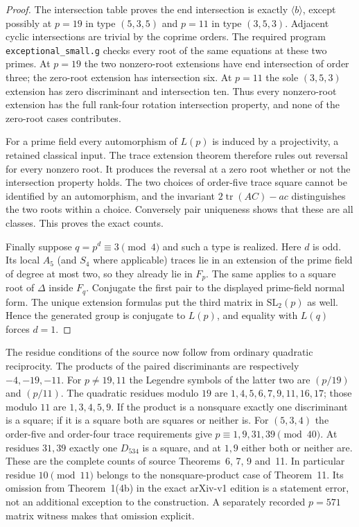 \begin{proof}
The intersection table proves the end intersection is exactly
$\langle b\rangle$, except possibly at $p=19$ in type $(5,3,5)$
and $p=11$ in type $(3,5,3)$. Adjacent cyclic intersections are trivial
by the coprime orders. The required program \texttt{exceptional\_small.g}
checks every root of the same equations at these two primes. At $p=19$
the two nonzero-root extensions have end intersection of order three;
the zero-root extension has intersection six. At $p=11$ the sole
$(3,5,3)$ extension has zero discriminant and intersection ten.
Thus every nonzero-root extension has the full rank-four rotation
intersection property, and none of the zero-root cases contributes.

For a prime field every automorphism of $L(p)$ is induced by a
projectivity, a retained classical input. The trace extension theorem
therefore rules out reversal for every nonzero root. It produces the
reversal at a zero root whether or not the intersection property holds.
The two choices of order-five trace square cannot be identified by
an automorphism, and the invariant $2\operatorname{tr}(AC)-ac$
distinguishes the two roots within a choice. Conversely pair uniqueness
shows that these are all classes. This proves the exact counts.

Finally suppose $q=p^d\equiv3\pmod4$ and such a type is realized.
Here $d$ is odd. Its local $A_5$ (and $S_4$ where applicable) traces
lie in an extension of the prime field of degree at most two, so they
already lie in $F_p$. The same applies to a square root of $\Delta$
inside $F_q$. Conjugate the first pair to the displayed prime-field
normal form. The unique extension formulas put the third matrix in
$\mathrm{SL}_2(p)$ as well. Hence the generated group is conjugate to
$L(p)$, and equality with $L(q)$ forces $d=1$.
\end{proof}

The residue conditions of the source now follow from ordinary quadratic
reciprocity. The products of the paired discriminants are respectively
$-4,-19,-11$. For $p\ne19,11$ the Legendre symbols of the latter two
are $(p/19)$ and $(p/11)$. The quadratic residues modulo $19$ are
$1,4,5,6,7,9,11,16,17$; those modulo $11$ are $1,3,4,5,9$.
If the product is a nonsquare exactly one discriminant is a square;
if it is a square both are squares or neither is.
For $(5,3,4)$ the order-five and order-four trace requirements give
$p\equiv1,9,31,39\pmod{40}$. At residues $31,39$ exactly one
$D_{534}$ is a square, and at $1,9$ either both or neither are.
These are the complete counts of source Theorems~6, 7, 9 and~11.
In particular residue $10\pmod{11}$ belongs to the nonsquare-product
case of Theorem~11. Its omission from Theorem~1(4b) in the exact
arXiv-v1 edition is a statement error, not an additional exception to
the construction. A separately recorded $p=571$ matrix witness makes
that omission explicit.

